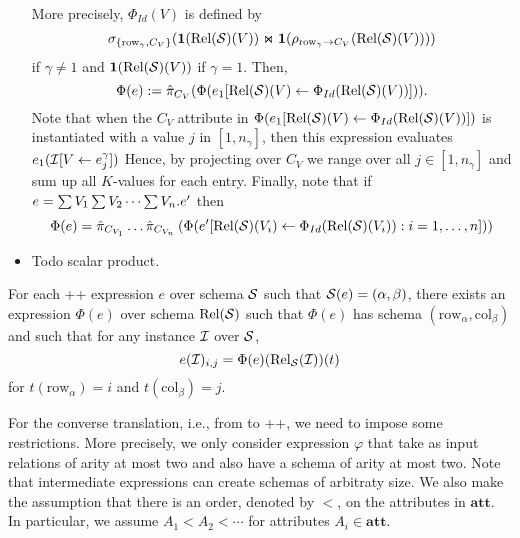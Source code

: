 \begin{itemize}
	More precisely, $\Phi_{Id}(V)$ is  defined by
	$$
	\sigma_{\{\mathrm{row}_\gamma,C_V\}}(\mathbf{1}(\text{Rel}(\mathcal{S})(V)) \Join \mathbf{1}(\rho_{\mathrm{row}_\gamma \to C_V}(\text{Rel}(\mathcal{S})(V))))$$
	if $\gamma \neq 1$ and
   $\mathbf{1}(\text{Rel}(\mathcal{S})(V))$ if $\gamma = 1$.
   Then,
	$$
	\Phi(e):=\hat{\pi}_{C_V}(\Phi(e_1[\text{Rel}(\mathcal{S})(V)\gets \Phi_{Id}(\text{Rel}(\mathcal{S})(V))])).
	$$
	Note that when the $C_{V}$ attribute in $\Phi(e_1[\text{Rel}(\mathcal{S})(V)\gets \Phi_{Id}(\text{Rel}(\mathcal{S})(V))])$
	is instantiated with a value $j$ in $[1,n_\gamma]$, then this expression evaluates $e_1(\mathcal{I}[V\gets e_j^\gamma])$
	Hence, by projecting over $C_V$ we range over all $j\in[1,n_\gamma]$ and sum up all $K$-values for each entry. 
	Finally, note that if $e=\textstyle\sum V_1 \textstyle\sum V_2 \cdots \textstyle\sum V_n. e'$ then$$\Phi(e)=\hat{\pi}_{C_{V_1}} \ldots \hat{\pi}_{C_{V_n}}\left( \Phi(e'[\text{Rel}(\mathcal{S})(V_i)\gets \Phi_{Id}(\text{Rel}(\mathcal{S})(V_i)):i=1,\ldots, n])\right)$$ 
	\item Todo scalar product.
\end{itemize}

\begin{proposition}
	For each \lang++ expression $e$ over schema $\mathcal{S}$ such that $\mathcal{S}(e)=(\alpha,\beta)$, there exists an \ARA expression $\Phi(e)$ over schema $\text{Rel}(\mathcal{S})$ such that $\Phi(e)$ has schema $(\mathrm{row}_\alpha,\mathrm{col}_\beta)$ and 
	such that for any instance $\mathcal{I}$ over $\mathcal{S}$,
	$$
	e(\mathcal{I})_{i,j}=\Phi(e)(\text{Rel}_{\mathcal{S}}(\mathcal{I}))(t)
	$$
	for $t(\mathrm{row}_\alpha)=i$ and $t(\mathrm{col}_\beta)=j$.
\end{proposition}

For the converse translation, i.e., from \ARA to \lang++, we need to impose some restrictions. More precisely, we only consider \ARA expression $\varphi$
that take as input relations of arity at most two and also have a schema of arity at most two. Note that intermediate expressions can create schemas of arbitraty size. We also make the assumption that there is an order, denoted by $<$, on the attributes in $\mathbf{att}$. In particular, we assume $A_1<A_2<\cdots$ for attributes $A_i\in\mathbf{att}$.

